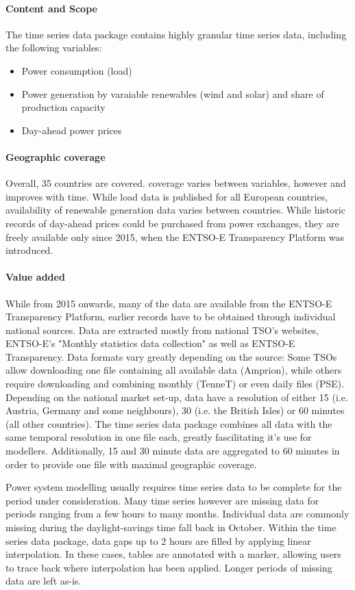 \documentclass[article]{elsarticle}
\begin{document}
\paragraph{Content and Scope}
The time series data package contains highly granular time series data, including the following variables:
\begin{itemize}
    \item Power consumption (load)
    \item Power generation by varaiable renewables (wind and solar) and share of production capacity 
    \item Day-ahead power prices
\end{itemize}

\paragraph{Geographic coverage}
Overall, 35 countries are covered. coverage varies between variables, however and improves with time. While load data is published for all European countries, availability of renewable generation data varies between countries. While historic records of day-ahead prices could be purchased from power exchanges, they are freely available only since 2015, when the ENTSO-E Transparency Platform was introduced.

\paragraph{Value added}
While from 2015 onwards, many of the data are available from the ENTSO-E Transparency Platform, earlier records have to be obtained through individual national sources. Data are extracted mostly from national TSO's websites, ENTSO-E's "Monthly statistics data collection" as well as ENTSO-E Transparency. Data formats vary greatly depending on the source: Some TSOs allow downloading one file containing all available data (Amprion), while others require downloading and combining monthly (TenneT) or even daily files (PSE). Depending on the national market set-up, data have a resolution of either 15 (i.e. Austria, Germany and some neighbours), 30 (i.e. the British Isles) or 60 minutes (all other countries). The time series data package combines all data with the same temporal resolution in one file each, greatly fascilitating it's use for modellers. Additionally, 15 and 30 minute data are aggregated to 60 minutes in order to provide one file with maximal geographic coverage.

Power system modelling usually requires time series data to be complete for the period under consideration. Many time series however are missing data for periods ranging from a few hours to many months. Individual data are commonly missing during the daylight-savings time fall back in October. Within the time series data package, data gaps up to 2 hours are filled by applying linear interpolation. In these cases, tables are annotated with a marker, allowing users to trace back where interpolation has been applied. Longer periods of missing data are left as-is.
\end{document}
